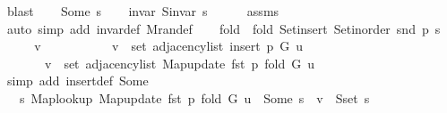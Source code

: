 \begin{isabellebody}
\ blast\isanewline
{}\isamarkupfalse%
\isanewline
\ \ \isamarkupfalse%
\ {\isacharparenleft}{\kern0pt}Some\ s{\isacharprime}{\kern0pt}{\isacharparenright}{\kern0pt}\isanewline
\ \ \isamarkupfalse%
\ invar{\isacharcolon}{\kern0pt}\ {\isachardoublequoteopen}S{\isachardot}{\kern0pt}invar\ s{\isacharprime}{\kern0pt}{\isachardoublequoteclose}\isanewline
\ \ \ \ \isamarkupfalse%
\ assms{\isacharparenleft}{\kern0pt}{}{\isacharparenright}{\kern0pt}\isanewline
\ \ \ \ \isamarkupfalse%
\ {\isacharparenleft}{\kern0pt}auto\ simp\ add{\isacharcolon}{\kern0pt}\ invar{\isacharunderscore}{\kern0pt}def\ M{\isachardot}{\kern0pt}ran{\isacharunderscore}{\kern0pt}def{\isacharparenright}{\kern0pt}\isanewline
\ \ \isamarkupfalse%
\ {\isacharquery}{\kern0pt}fold\ {\isacharequal}{\kern0pt}\ {\isachardoublequoteopen}fold\ Set{\isacharunderscore}{\kern0pt}insert\ {\isacharparenleft}{\kern0pt}Set{\isacharunderscore}{\kern0pt}inorder\ {\isacharparenleft}{\kern0pt}snd\ p{\isacharparenright}{\kern0pt}{\isacharparenright}{\kern0pt}\ s{\isacharprime}{\kern0pt}{\isachardoublequoteclose}\isanewline
\ \ \isacommand{{\isacharbraceleft}{\kern0pt}}\isamarkupfalse%
\ \isamarkupfalse%
\ v\isanewline
\ \ \ \ \isamarkupfalse%
\isanewline
\ \ \ \ \ \ {\isachardoublequoteopen}v\ {\isasymin}\ set\ {\isacharparenleft}{\kern0pt}adjacency{\isacharunderscore}{\kern0pt}list\ {\isacharparenleft}{\kern0pt}insert{\isacharunderscore}{\kern0pt}{}\ p\ G{\isacharparenright}{\kern0pt}\ u{\isacharparenright}{\kern0pt}\ {\isasymlongleftrightarrow}\isanewline
\ \ \ \ \ \ \ v\ {\isasymin}\ set\ {\isacharparenleft}{\kern0pt}adjacency{\isacharunderscore}{\kern0pt}list\ {\isacharparenleft}{\kern0pt}Map{\isacharunderscore}{\kern0pt}update\ {\isacharparenleft}{\kern0pt}fst\ p{\isacharparenright}{\kern0pt}\ {\isacharquery}{\kern0pt}fold\ G{\isacharparenright}{\kern0pt}\ u{\isacharparenright}{\kern0pt}{\isachardoublequoteclose}\isanewline
\ \ \ \ \ \ \isamarkupfalse%
\ {\isacharparenleft}{\kern0pt}simp\ add{\isacharcolon}{\kern0pt}\ insert{\isacharunderscore}{\kern0pt}{}{\isacharunderscore}{\kern0pt}def\ Some{\isacharparenright}{\kern0pt}\isanewline
\ \ \ \ \isamarkupfalse%
\ \isamarkupfalse%
\ {\isachardoublequoteopen}{\isachardot}{\kern0pt}{\isachardot}{\kern0pt}{\isachardot}{\kern0pt}\ {\isasymlongleftrightarrow}\ {\isacharparenleft}{\kern0pt}{\isasymexists}s{\isachardot}{\kern0pt}\ Map{\isacharunderscore}{\kern0pt}lookup\ {\isacharparenleft}{\kern0pt}Map{\isacharunderscore}{\kern0pt}update\ {\isacharparenleft}{\kern0pt}fst\ p{\isacharparenright}{\kern0pt}\ {\isacharquery}{\kern0pt}fold\ G{\isacharparenright}{\kern0pt}\ u\ {\isacharequal}{\kern0pt}\ Some\ s\ {\isasymand}\ v\ {\isasymin}\ S{\isachardot}{\kern0pt}set\ s{\isacharparenright}{\kern0pt}{\isachardoublequoteclose}\isanewline

\end{isabellebody}
